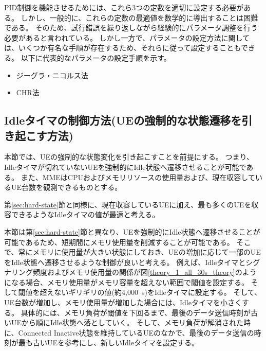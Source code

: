 \documentclass[a4j]{ujarticle}
\begin{document}
PID制御を機能させるためには、これら3つの定数を適切に設定する必要がある。
しかし、一般的に、これらの定数の最適値を数学的に導出することは困難である。
そのため、試行錯誤を繰り返しながら経験的にパラメータ調整を行う必要があると言われている。
しかし一方で、パラメータの設定方法に関しては、いくつか有名な手順が存在するため、それらに従って設定することもできる。
以下に代表的なパラメータの設定手順を示す。
\begin{itemize}
  \item ジーグラ・ニコルス法
  \item CHR法
\end{itemize}


\subsection{Idleタイマの制御方法(UEの強制的な状態遷移を引き起こす方法)}
\label{sec:soft-state}
本節では、UEの強制的な状態変化を引き起こすことを前提にする。
つまり、Idleタイマが切れていないUEを強制的にIdle状態へ遷移させることが可能である。
また、MMEはCPUおよびメモリリソースの使用量および、現在収容しているUE台数を観測できるものとする。

第\ref{sec:hard-state}節と同様に、現在収容しているUEに加え、最も多くのUEを収容できるようなIdleタイマの値が最適と考える。

本節は第\ref{sec:hard-state}節と異なり、UEを強制的にIdle状態へ遷移させることが可能であるため、短期間にメモリ使用量を削減することが可能である。
そこで、常にメモリに使用量が大きい状態にしておき、UEの増加に応じて一部のUEをIdle状態へ遷移させるような制御が良いと考える。
例えば、Idleタイマとシグナリング頻度およびメモリ使用量の関係が図\ref{theory_1_all_30s_theory}のようになる場合、メモリ使用量がメモリ容量を超えない範囲で閾値を設定する。
そして閾値を超えないギリギリの値(約4,000~s)をIdleタイマに設定する。
そして、UE台数が増加し、メモリ使用量が増加した場合には、Idleタイマを小さくする。
具体的には、メモリ負荷が閾値を下回るまで、最後のデータ送信時刻が古いUEから順にIdle状態へ落としていく。
そして、メモリ負荷が解消された時に、Connected Inactive状態を維持しているUEのなかで、最後のデータ送信の時刻が最も古いUEを参考にし、新しいIdleタイマを設定する。
\end{document}
